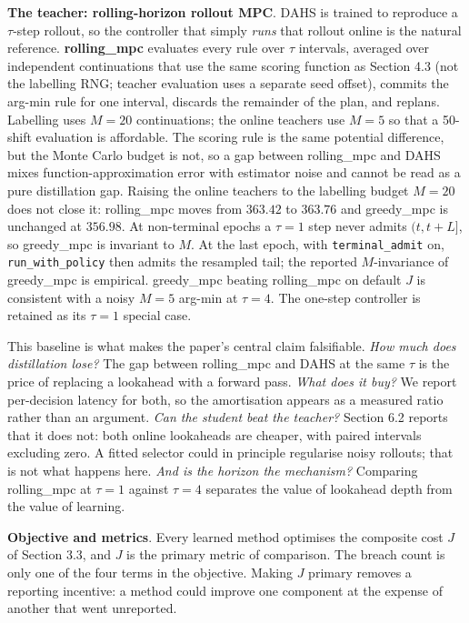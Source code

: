 \documentclass[review,3p,times]{elsarticle}
\theoremstyle{definition}
\begin{document}
\textbf{The teacher: rolling-horizon rollout MPC}. DAHS is trained to
reproduce a \(\tau\)-step rollout, so the controller that simply
\emph{runs} that rollout online is the natural reference.
\textbf{rolling\_mpc} evaluates every rule over \(\tau\) intervals,
averaged over independent continuations that use the same scoring
function as Section 4.3 (not the labelling RNG; teacher evaluation uses
a separate seed offset), commits the arg-min rule for one interval,
discards the remainder of the plan, and replans. Labelling uses \(M=20\)
continuations; the online teachers use \(M=5\) so that a 50-shift
evaluation is affordable. The scoring rule is the same potential
difference, but the Monte Carlo budget is not, so a gap between
rolling\_mpc and DAHS mixes function-approximation error with estimator
noise and cannot be read as a pure distillation gap. Raising the online
teachers to the labelling budget \(M=20\) does not close it:
rolling\_mpc moves from \(363.42\) to \(363.76\) and greedy\_mpc is
unchanged at \(356.98\). At non-terminal epochs a \(\tau=1\) step never
admits \((t,t+L]\), so greedy\_mpc is invariant to \(M\). At the last
epoch, with \texttt{terminal\_admit} on, \texttt{run\_with\_policy} then
admits the resampled tail; the reported \(M\)-invariance of greedy\_mpc
is empirical. greedy\_mpc beating rolling\_mpc on default \(J\) is
consistent with a noisy \(M=5\) arg-min at \(\tau=4\). The one-step
controller is retained as its \(\tau = 1\) special case.

This baseline is what makes the paper's central claim falsifiable.
\emph{How much does distillation lose?} The gap between rolling\_mpc and
DAHS at the same \(\tau\) is the price of replacing a lookahead with a
forward pass. \emph{What does it buy?} We report per-decision latency
for both, so the amortisation appears as a measured ratio rather than an
argument. \emph{Can the student beat the teacher?} Section 6.2 reports
that it does not: both online lookaheads are cheaper, with paired
intervals excluding zero. A fitted selector could in principle
regularise noisy rollouts; that is not what happens here. \emph{And is
the horizon the mechanism?} Comparing rolling\_mpc at \(\tau = 1\)
against \(\tau = 4\) separates the value of lookahead depth from the
value of learning.

\textbf{Objective and metrics}. Every learned method optimises the
composite cost \(J\) of Section 3.3, and \(J\) is the primary metric of
comparison. The breach count is only one of the four terms in the
objective. Making \(J\) primary removes a reporting incentive: a method
could improve one component at the expense of another that went
unreported.
\end{document}
